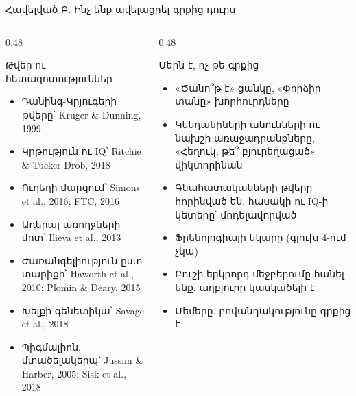 \begin{frame}{Հավելված Բ. Ինչ ենք ավելացրել գրքից դուրս}
  \begin{columns}[T]
    \begin{column}{0.48\textwidth}
      \begin{card}[colback=mint!30!cardwhite, fontupper=\scriptsize]
        {\blackfont Թվեր ու հետազոտություններ}\par\smallskip
        \begin{itemize}\setlength{\itemsep}{0.2mm}
          \item Դանինգ-Կրյուգերի թվերը՝ Kruger \& Dunning, 1999
          \item Կրթություն ու IQ՝ Ritchie \& Tucker-Drob, 2018
          \item Ուղեղի մարզում՝ Simons et al., 2016; FTC, 2016
          \item Ադերալ առողջների մոտ՝ Ilieva et al., 2013
          \item Ժառանգելիություն ըստ տարիքի՝ Haworth et al., 2010; Plomin \& Deary, 2015
          \item Խելքի գենետիկա՝ Savage et al., 2018
          \item Պիգմալիոն, մտածելակերպ՝ Jussim \& Harber, 2005; Sisk et al., 2018
        \end{itemize}
      \end{card}
    \end{column}
    \begin{column}{0.48\textwidth}
      \begin{card}[colback=peach!35!cardwhite, fontupper=\scriptsize]
        {\blackfont Մերն է, ոչ թե գրքից}\par\smallskip
        \begin{itemize}\setlength{\itemsep}{0.2mm}
          \item «Ծանո՞թ է» ցանկը, «Փորձիր տանը» խորհուրդները
          \item Կենդանիների անունների ու նախշի առաջադրանքները, «Հեղուկ, թե՞ բյուրեղացած» վիկտորինան
          \item Գնահատականների թվերը հորինված են, հասակի ու IQ-ի կետերը՝ մոդելավորված
          \item Ֆրենոլոգիայի նկարը (գլուխ 4-ում չկա)
          \item Բուշի երկրորդ մեջբերումը հանել ենք. աղբյուրը կասկածելի է
          \item Մեմերը. բովանդակությունը գրքից է
        \end{itemize}
      \end{card}
    \end{column}
  \end{columns}
\end{frame}

